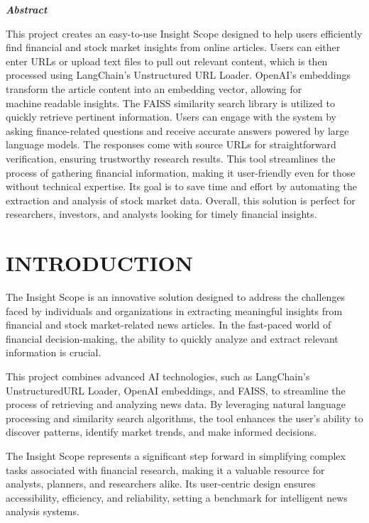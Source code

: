 \documentclass[12pt,a4paper]{report}
\begin{document}
\newpage
{}
\begin{center}
{\LARGE \textbf{\textit{Abstract}}}
\end{center}
\vspace{1cm}
{\Large
	{\large This project creates an easy-to-use Insight Scope designed to 
help users efficiently find financial and stock market insights from 
online articles. Users can either enter URLs or upload text files to pull 
out relevant content, which is then processed using LangChain’s 
Unstructured URL Loader. OpenAI’s embeddings transform the 
article content into an embedding vector, allowing for machine￾readable insights. The FAISS similarity search library is utilized to 
quickly retrieve pertinent information. Users can engage with the 
system by asking finance-related questions and receive accurate 
answers powered by large language models. The responses come with 
source URLs for straightforward verification, ensuring trustworthy 
research results. This tool streamlines the process of gathering 
financial information, making it user-friendly even for those without 
technical expertise. Its goal is to save time and effort by automating 
the extraction and analysis of stock market data. Overall, this solution 
is perfect for researchers, investors, and analysts looking for timely 
financial insights.}

\newpage
{}
\listoffigures
	
\newpage
{}
\chapter{INTRODUCTION}
The Insight Scope is an innovative solution designed to address the challenges faced by individuals and organizations in extracting meaningful insights from financial and stock market-related news articles. In the fast-paced world of financial decision-making, the ability to quickly analyze and extract relevant information is crucial.

This project combines advanced AI technologies, such as LangChain's UnstructuredURL Loader, OpenAI embeddings, and FAISS, to streamline the process of retrieving and analyzing news data. By leveraging natural language processing and similarity search algorithms, the tool enhances the user's ability to discover patterns, identify market trends, and make informed decisions.

The Insight Scope represents a significant step forward in simplifying complex tasks associated with financial research, making it a valuable resource for analysts, planners, and researchers alike. Its user-centric design ensures accessibility, efficiency, and reliability, setting a benchmark for intelligent news analysis systems.
}
\end{document}
